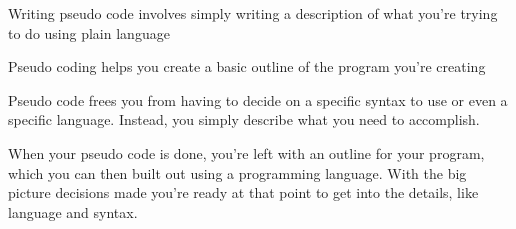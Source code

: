 Writing pseudo code involves simply writing a description of what you're trying to do using plain language

Pseudo coding helps you create a basic outline of the program you're creating

Pseudo code  frees you from having to decide on a specific syntax to use or even a specific language. Instead, you simply describe what you need to accomplish.

When your pseudo code is done, you're left with an outline for your program, 
which you can then built out using a programming language. 
With the big picture decisions made you're ready at that point to get into the details,
 like language and syntax.